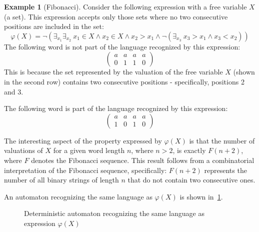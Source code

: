 \documentclass[12pt]{article}
\newcommand{\icol}[1]{%
  \left(\begin{smallmatrix}#1\end{smallmatrix}\right)%
}
\theoremstyle{definition}
\newtheorem{example}{Example}[section]
\begin{document}
\begin{example}[Fibonacci]
    \label{ExFib}
    Consider the following expression with a free variable $X$ (a set). This expression accepts only those sets where no two consecutive positions are included in the set:
    $$\varphi(X) = \neg(\exists_{x_1}\exists_{x_2} \ x_1 \in X \land x_2 \in X \land x_2 > x_1 \land \neg(\exists_{x_3} \ x_3 > x_1 \land x_3 < x_2 ))$$
    The following word is not part of the language recognized by this expression:
    $$\begin{pmatrix}
        a & a & a & a\\
        0 & 1 & 1 & 0
    \end{pmatrix}$$
    This is because the set represented by the valuation of the free variable $X$ (shown in the second row) contains two consecutive positions - specifically, positions 2 and 3.

    The following word is part of the language recognized by this expression:
    $$\begin{pmatrix}
        a & a & a & a\\
        1 & 0 & 1 & 0
    \end{pmatrix}$$

    The interesting aspect of the property expressed by $\varphi(X)$ is that the number of valuations of $X$ for a given word length $n$, where $n > 2$, is exactly $F(n + 2)$, where $F$ denotes the Fibonacci sequence. This result follows from a combinatorial interpretation of the Fibonacci sequence, specifically: $F(n+2)$ represents the number of all binary strings of length $n$ that do not contain two consecutive ones.

    An automaton recognizing the same language as $\varphi(X)$ is shown in~\cref{fig:my_label}.

    \begin{figure}[ht]
        \centering
        \caption{Deterministic automaton recognizing the same language as expression $\varphi(X)$}
        \label{fig:my_label}
    \end{figure}
\end{example} \
\end{document}
